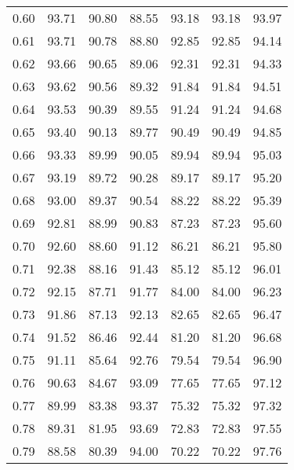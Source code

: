 \begin{tabular}{|c|c|c|c|c|c|c|}
      0.60 &     93.71 &     90.80 &      88.55 &   93.18 &      93.18 &         93.97 \\
      0.61 &     93.71 &     90.78 &      88.80 &   92.85 &      92.85 &         94.14 \\
      0.62 &     93.66 &     90.65 &      89.06 &   92.31 &      92.31 &         94.33 \\
      0.63 &     93.62 &     90.56 &      89.32 &   91.84 &      91.84 &         94.51 \\
      0.64 &     93.53 &     90.39 &      89.55 &   91.24 &      91.24 &         94.68 \\
      0.65 &     93.40 &     90.13 &      89.77 &   90.49 &      90.49 &         94.85 \\
      0.66 &     93.33 &     89.99 &      90.05 &   89.94 &      89.94 &         95.03 \\
      0.67 &     93.19 &     89.72 &      90.28 &   89.17 &      89.17 &         95.20 \\
      0.68 &     93.00 &     89.37 &      90.54 &   88.22 &      88.22 &         95.39 \\
      0.69 &     92.81 &     88.99 &      90.83 &   87.23 &      87.23 &         95.60 \\
      0.70 &     92.60 &     88.60 &      91.12 &   86.21 &      86.21 &         95.80 \\
      0.71 &     92.38 &     88.16 &      91.43 &   85.12 &      85.12 &         96.01 \\
      0.72 &     92.15 &     87.71 &      91.77 &   84.00 &      84.00 &         96.23 \\
      0.73 &     91.86 &     87.13 &      92.13 &   82.65 &      82.65 &         96.47 \\
      0.74 &     91.52 &     86.46 &      92.44 &   81.20 &      81.20 &         96.68 \\
      0.75 &     91.11 &     85.64 &      92.76 &   79.54 &      79.54 &         96.90 \\
      0.76 &     90.63 &     84.67 &      93.09 &   77.65 &      77.65 &         97.12 \\
      0.77 &     89.99 &     83.38 &      93.37 &   75.32 &      75.32 &         97.32 \\
      0.78 &     89.31 &     81.95 &      93.69 &   72.83 &      72.83 &         97.55 \\
      0.79 &     88.58 &     80.39 &      94.00 &   70.22 &      70.22 &         97.76 \\

\end{tabular}
